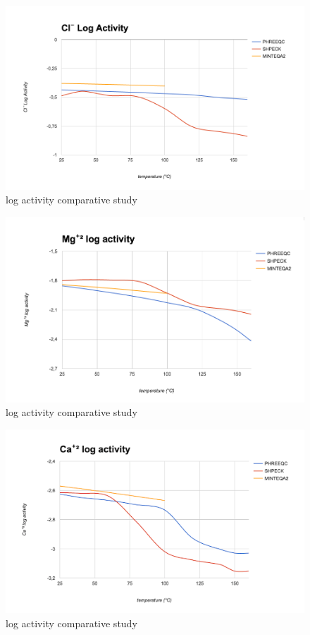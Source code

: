 \begin{figure}[ht!]
\centering
\includegraphics[width=140mm]{figures/cl-.png}
\caption{ log activity comparative study}
\label{fig:cl-}
\end{figure}

\begin{figure}[ht!]
\centering
\includegraphics[width=140mm]{figures/mg+2.png}
\caption{ log activity comparative study}
\label{fig:mg+2}
\end{figure}

\begin{figure}[ht!]
\centering
\includegraphics[width=140mm]{figures/ca+2.png}
\caption{ log activity comparative study}
\label{fig:ca+2}
\end{figure}

